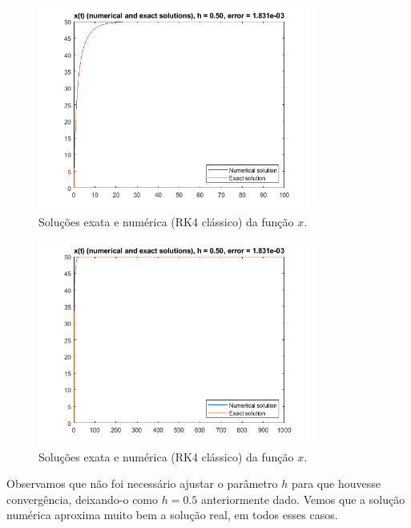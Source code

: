 \documentclass{article}
\begin{document}
\begin{enumerate}
\begin{enumerate}
                        \begin{figure}[!h]
                            \centering
                            \includegraphics[width=0.8\textwidth]{rk_3.png}
                            \caption{Soluções exata e numérica (RK4 clássico)
                            da função $x$.}
                            \label{fig:rk_3}
                        \end{figure}
                
                        \begin{figure}[!h]
                            \centering
                            \includegraphics[width=0.8\textwidth]{rk_4.png}
                            \caption{Soluções exata e numérica (RK4 clássico)
                            da função $x$.}
                            \label{fig:rk_4}
                        \end{figure}

                        \clearpage

                        Observamos que não foi necessário ajustar o parâmetro
                        $h$ para que houvesse convergência, deixando-o como
                        $h = 0.5$ anteriormente dado. Vemos que a solução
                        numérica aproxima muito bem a solução real, em todos
                        esses casos.


\end{enumerate}
\end{enumerate}
\end{document}
